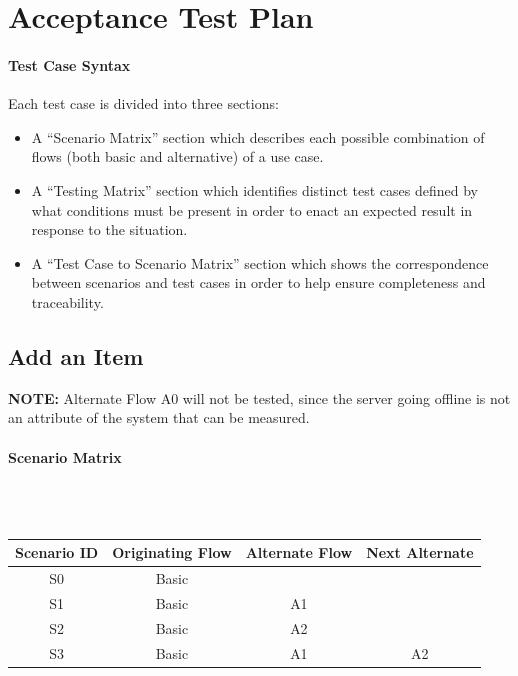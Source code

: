 \documentclass{article}
\begin{document}
\section{Acceptance Test Plan}
\label{test_case}

\paragraph{Test Case Syntax}
Each test case is divided into three sections:
\begin{itemize}
\item A ``Scenario Matrix'' section which describes each possible combination of flows (both basic and alternative) of a use case.
\item A ``Testing Matrix'' section which identifies distinct test cases defined by what conditions must be present in order to enact an expected result in response to the situation.
\item A ``Test Case to Scenario Matrix'' section which shows the correspondence between scenarios and test cases in order to help ensure completeness and traceability.
\end{itemize}

\subsection{Add an Item}
\textbf{NOTE:} Alternate Flow A0 will not be tested, since the server going offline is not an attribute of the system that can be measured.\label{flow}

\paragraph{Scenario Matrix}~\\ \\
\begin{tabular}{ c  c  c  c }
\hline
Scenario ID & Originating Flow & Alternate Flow & Next Alternate\label{scenario}\\
\hline
\hline
S0 & Basic &  & \\
\hline
S1 & Basic & A1 & \\
\hline
S2 & Basic & A2 & \\
\hline
S3 & Basic & A1 & A2\\
\hline
\end{tabular}\\
~\\
~\\
\end{document}
